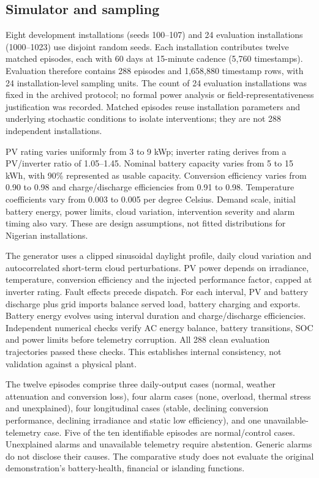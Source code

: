 \documentclass[11pt,a4paper]{article}
\begin{document}
\subsection{Simulator and sampling}

Eight development installations (seeds 100--107) and 24 evaluation installations (1000--1023) use disjoint random seeds. Each installation contributes twelve matched episodes, each with 60 days at 15-minute cadence (5,760 timestamps). Evaluation therefore contains 288 episodes and 1,658,880 timestamp rows, with 24 installation-level sampling units. The count of 24 evaluation installations was fixed in the archived protocol; no formal power analysis or field-representativeness justification was recorded. Matched episodes reuse installation parameters and underlying stochastic conditions to isolate interventions; they are not 288 independent installations.


PV rating varies uniformly from 3 to 9 kWp; inverter rating derives from a PV/inverter ratio of 1.05--1.45. Nominal battery capacity varies from 5 to 15 kWh, with 90\% represented as usable capacity. Conversion efficiency varies from 0.90 to 0.98 and charge/discharge efficiencies from 0.91 to 0.98. Temperature coefficients vary from 0.003 to 0.005 per degree Celsius. Demand scale, initial battery energy, power limits, cloud variation, intervention severity and alarm timing also vary. These are design assumptions, not fitted distributions for Nigerian installations.


The generator uses a clipped sinusoidal daylight profile, daily cloud variation and autocorrelated short-term cloud perturbations. PV power depends on irradiance, temperature, conversion efficiency and the injected performance factor, capped at inverter rating. Fault effects precede dispatch. For each interval, PV and battery discharge plus grid imports balance served load, battery charging and exports. Battery energy evolves using interval duration and charge/discharge efficiencies. Independent numerical checks verify AC energy balance, battery transitions, SOC and power limits before telemetry corruption. All 288 clean evaluation trajectories passed these checks. This establishes internal consistency, not validation against a physical plant.


The twelve episodes comprise three daily-output cases (normal, weather attenuation and conversion loss), four alarm cases (none, overload, thermal stress and unexplained), four longitudinal cases (stable, declining conversion performance, declining irradiance and static low efficiency), and one unavailable-telemetry case. Five of the ten identifiable episodes are normal/control cases. Unexplained alarms and unavailable telemetry require abstention. Generic alarms do not disclose their causes. The comparative study does not evaluate the original demonstration's battery-health, financial or islanding functions.
\end{document}
